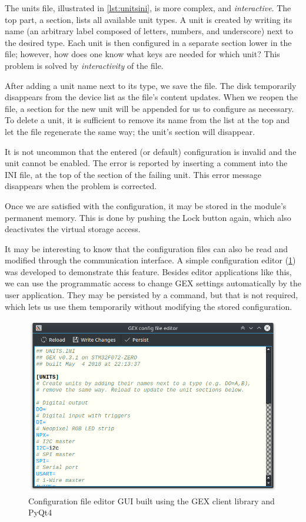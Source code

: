 The units file, illustrated in \cref{lst:unitsini}, is more complex, and \textit{interactive}. The top part, a \mono{[UNITS]} section, lists all available unit types. A unit is created by writing its name (an arbitrary label composed of letters, numbers, and underscore) next to the desired type. Each unit is then configured in a separate section lower in the file; however, how does one know what keys are needed for which unit? This problem is solved by \textit{interactivity} of the file.

After adding a unit name next to its type, we save the file. The disk temporarily disappears from the device list as the file's content updates. When we reopen the file, a section for the new unit will be appended for us to configure as necessary. To delete a unit, it is sufficient to remove its name from the list at the top and let the file regenerate the same way; the unit's section will disappear.

It is not uncommon that the entered (or default) configuration is invalid and the unit cannot be enabled. The error is reported by inserting a comment into the INI file, at the top of the section of the failing unit. This error message disappears when the problem is corrected.

Once we are satisfied with the configuration, it may be stored in the module's permanent memory. This is done by pushing the Lock button again, which also deactivates the virtual storage access.

It may be interesting to know that the configuration files can also be read and modified through the communication interface. A simple configuration editor (\cref{fig:gexync}) was developed to demonstrate this feature. Besides editor applications like this, we can use the programmatic access to change GEX settings automatically by the user application. They may be persisted by a command, but that is not required, which lets us use them temporarily without modifying the stored configuration.

\begin{figure}
	\centering
	\includegraphics[width=.8\textwidth] {img/gexync.png}
	\caption[Configuration file editor GUI]{\label{fig:gexync}Configuration file editor GUI built using the GEX client library and PyQt4}
\end{figure}



















